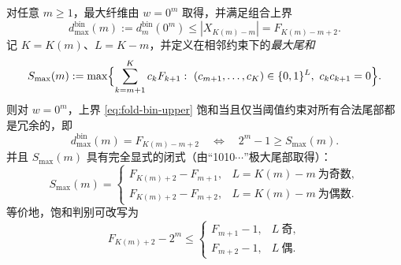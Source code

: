 
\begin{corollary}\label{cor:fold-bin-saturation}
对任意 \(m\ge 1\)，最大纤维由 \(w=0^m\) 取得，并满足组合上界
\begin{equation}\label{eq:fold-bin-upper}
d^{\mathrm{bin}}_{\max}(m):=d^{\mathrm{bin}}_m(0^m)\le |X_{K(m)-m}|=F_{K(m)-m+2}.
\end{equation}
记 \(K=K(m)\)、\(L=K-m\)，并定义在相邻约束下的\emph{最大尾和}
\[
S_{\max}(m):=\max\Bigl\{\sum_{k=m+1}^{K} c_k F_{k+1}:\ (c_{m+1},\dots,c_K)\in\{0,1\}^{L},\ c_k c_{k+1}=0\Bigr\}.
\]
则对 \(w=0^m\)，上界 \eqref{eq:fold-bin-upper} 饱和当且仅当阈值约束对所有合法尾部都是冗余的，即
\begin{equation}\label{eq:fold-bin-sat-iff}
d^{\mathrm{bin}}_{\max}(m)=F_{K(m)-m+2}\quad\Longleftrightarrow\quad 2^m-1\ge S_{\max}(m).
\end{equation}
并且 \(S_{\max}(m)\) 具有完全显式的闭式（由“1010\(\cdots\)”极大尾部取得）：
\begin{equation}\label{eq:fold-bin-Smax-closed}
S_{\max}(m)=
\begin{cases}
F_{K(m)+2}-F_{m+1}, & L=K(m)-m\ \text{为奇数},\\
F_{K(m)+2}-F_{m+2}, & L=K(m)-m\ \text{为偶数}.
\end{cases}
\end{equation}
等价地，饱和判别可改写为
\[
F_{K(m)+2}-2^m\le
\begin{cases}
F_{m+1}-1,& L\ \text{奇},\\
F_{m+2}-1,& L\ \text{偶}.
\end{cases}
\]
\end{corollary}

